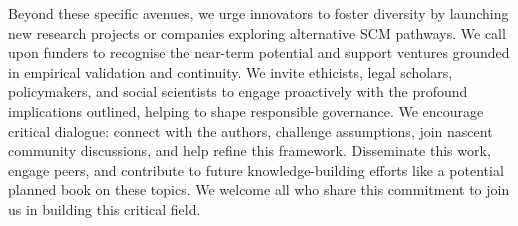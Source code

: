 \documentclass[10pt]{article}
\begin{document}
\begin{sloppypar}
  Beyond these specific avenues, we urge innovators to foster diversity by launching new research projects or companies exploring alternative SCM pathways. We call upon funders to recognise the near-term potential and support ventures grounded in empirical validation and continuity. We invite ethicists, legal scholars, policymakers, and social scientists to engage proactively with the profound implications outlined, helping to shape responsible governance. We encourage critical dialogue: connect with the authors, challenge assumptions, join nascent community discussions, and help refine this framework. Disseminate this work, engage peers, and contribute to future knowledge-building efforts like a potential planned book on these topics. We welcome all who share this commitment to join us in building this critical field.


  \pagebreak
  
  
  \nocite{*}

\end{sloppypar}
\end{document}
